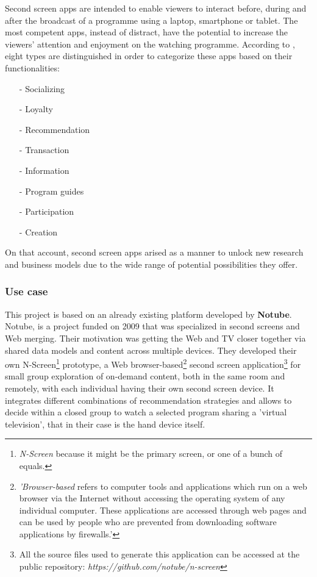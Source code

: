 \documentclass{acm_proc_article-sp}
\begin{document}
Second screen apps \cite{evolumedia1} are intended to enable viewers to interact before, during and after the broadcast of a programme using a laptop, smartphone or tablet. The most competent apps, instead of distract, have the potential to increase the viewers' attention and enjoyment on the watching programme. According to \cite{evolumedia1}, eight types are distinguished in order to categorize these apps based on their functionalities: 
\begin{itemize}
  \item[-] Socializing
  \item[-] Loyalty
  \item[-] Recommendation
  \item[-] Transaction
  \item[-] Information
  \item[-] Program guides
  \item[-] Participation
  \item[-] Creation
\end{itemize}
On that account, second screen apps arised as a manner to unlock new research and business models due to the wide range of potential possibilities they offer. 

\subsubsection{Use case}

This project is based on an already existing platform developed by \textbf{Notube}\cite{aroyo2009notube}. Notube, is a project funded on 2009 that was specialized in second screens and Web merging. Their motivation was getting the Web and TV closer together via shared data models and content across multiple devices. They developed their own N-Screen\footnote{\textit{N-Screen} because it might be the primary screen, or one of a bunch of equals.} prototype, a Web browser-based\cite{business:bb}\footnote{\textit{'Browser-based} refers to computer tools and applications which run on a web browser via the Internet without accessing the operating system of any individual computer. These applications are accessed through web pages and can be used by people who are prevented from downloading software applications by firewalls.'} second screen application\footnote{All the source files used to generate this application can be accessed at the public repository:
\textit{https://github.com/notube/n-screen}} for small group exploration of on-demand content, both in the same room and remotely, with each individual having their own second screen device. It integrates different combinations of recommendation strategies and allows to decide within a closed group to watch a selected program sharing a 'virtual television', that in their case is the hand device itself. 
\end{document}
